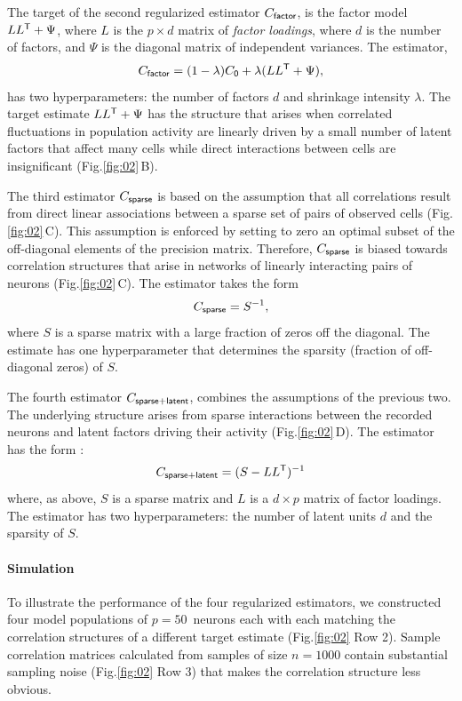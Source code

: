 \documentclass[10pt]{article}
\newcommand{\figref}[2]{Fig.\;\ref{fig:#1}\,#2}
\newcommand{\T}{{\sf T}}
\begin{document}
The target of the second regularized estimator $C_{\sf factor}$, is the factor model $LL^\T + \Psi$, where $L$ is the $p\times d$ matrix of \emph{factor loadings}, where $d$ is the number of factors, and $\Psi$ is the diagonal matrix of independent variances. The estimator, 
\begin{equation}\label{eq:c-factor}
C_{\sf factor} = (1-\lambda) C_{\sf 0} + \lambda (LL^\T + \Psi),
\end{equation}
has two hyperparameters: the number of factors $d$ and shrinkage intensity $\lambda$. The target estimate $LL^\T + \Psi$ has the structure that arises when correlated fluctuations in population activity are linearly driven by a small number of latent factors that affect many cells while direct interactions between cells are insignificant (\figref{02}{B}).   

The third estimator $C_{\sf sparse}$ is based on the assumption that all correlations result from direct linear associations between a sparse set of pairs of observed cells (\figref{02}{C}).  This assumption is enforced by setting to zero an optimal subset of the off-diagonal elements of the precision matrix.  Therefore, $C_{\sf sparse}$ is biased towards correlation structures that arise in networks of linearly interacting pairs of neurons (\figref{02}{C}). The estimator takes the form
\begin{equation}\label{eq:c-sparse}
C_{\sf sparse} = S^{-1},
\end{equation}
where $S$ is a sparse matrix with a large fraction of zeros off the diagonal. The estimate has one hyperparameter that determines the sparsity (fraction of off-diagonal zeros) of $S$.

The fourth estimator $C_{\sf sparse+latent}$, combines the assumptions of the previous two.  The underlying structure arises from sparse interactions between the recorded neurons and latent factors driving their activity (\figref{02}{D}). The estimator has the form \cite{Chandrasekaran:2010,Ma:2013}:
\begin{equation}\label{eq:c-sl}
C_{\sf sparse+latent} = (S - LL^\T)^{-1}
\end{equation}
where, as above, $S$ is a sparse matrix and $L$ is a $d\times p$ matrix of factor loadings. The estimator has two hyperparameters: the number of latent units $d$ and the sparsity of $S$.

\paragraph{Simulation}
To illustrate the performance of the four regularized estimators, we constructed four model populations of $p=50$~neurons each with each matching the correlation structures of a different target estimate (\figref{02}{\,Row 2}).  Sample correlation matrices calculated from samples of size $n=1000$ contain substantial sampling noise (\figref{02}{\,Row 3}) that makes the correlation structure less obvious.
\end{document}

